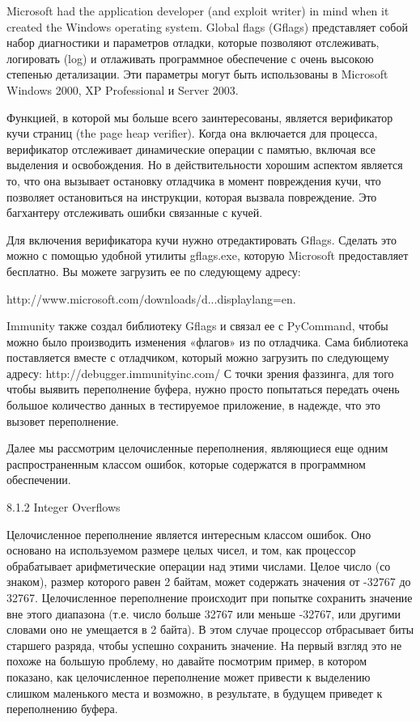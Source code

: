 \documentclass[12pt]{book}
\begin{document}
Microsoft had the application developer (and exploit writer) in mind when it created the Windows operating system. Global flags (Gflags) представляет собой набор диагностики и параметров отладки, которые позволяют отслеживать, логировать (log) и отлаживать программное обеспечение с очень высокою степенью детализации. Эти параметры могут быть использованы в Microsoft Windows 2000, XP Professional и Server 2003.

Функцией, в которой мы больше всего заинтересованы, является верификатор кучи страниц (the page heap verifier). Когда она включается для процесса, верификатор отслеживает динамические операции с памятью, включая все выделения и освобождения. Но в действительности хорошим аспектом является то, что она вызывает остановку отладчика в момент повреждения кучи, что позволяет остановиться на инструкции, которая вызвала повреждение. Это багхантеру отслеживать ошибки связанные с кучей. 

Для включения верификатора кучи нужно отредактировать Gflags. Сделать это можно с помощью удобной утилиты gflags.exe, которую Microsoft предоставляет бесплатно. Вы можете загрузить ее по следующему адресу:

http://www.microsoft.com/downloads/d...displaylang=en.

Immunity также создал библиотеку Gflags и связал ее с PyCommand, чтобы можно было производить изменения «флагов» из по отладчика. Сама библиотека поставляется вместе с отладчиком, который можно загрузить по следующему адресу: http://debugger.immunityinc.com/
С точки зрения фаззинга, для того чтобы выявить переполнение буфера, нужно просто попытаться передать очень большое количество данных в тестируемое приложение, в надежде, что это вызовет переполнение. 

Далее мы рассмотрим целочисленные переполнения, являющиеся еще одним распространенным классом ошибок, которые содержатся в программном обеспечении.

8.1.2 Integer Overflows

Целочисленное переполнение является интересным классом ошибок. Оно основано на используемом размере целых чисел, и том, как процессор обрабатывает арифметические операции над этими числами. Целое число (со знаком), размер которого равен 2 байтам, может содержать значения от -32767 до 32767. Целочисленное переполнение происходит при попытке сохранить значение вне этого диапазона (т.е. число больше 32767 или меньше -32767, или другими словами оно не умещается в 2 байта). В этом случае процессор отбрасывает биты старшего разряда, чтобы успешно сохранить значение. На первый взгляд это не похоже на большую проблему, но давайте посмотрим пример, в котором показано, как целочисленное переполнение может привести к выделению слишком маленького места и возможно, в результате, в будущем приведет к переполнению буфера.
\end{document}
